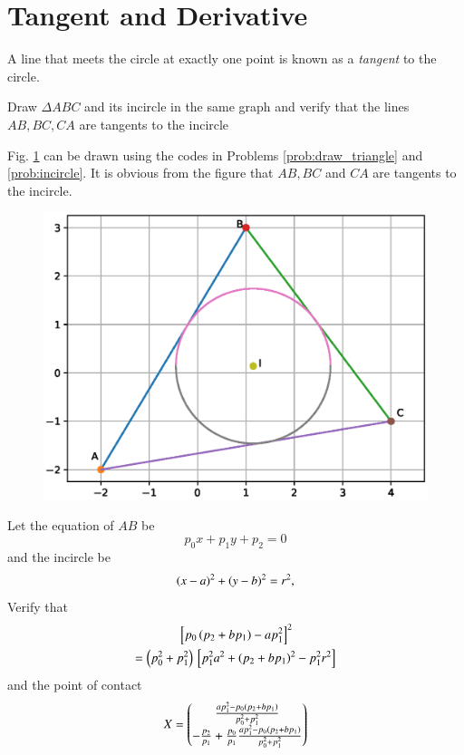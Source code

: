 \documentclass[journal,12pt,twocolumn]{IEEEtran}
\begin{document}
\section{Tangent and Derivative}
\begin{definition}
A line that meets the circle at exactly one point is known as a {\em tangent} to the circle.
\end{definition}
%
\begin{problem}
Draw $\Delta ABC$ and its incircle in the same graph and verify that the lines $AB, BC, CA$ are tangents to the incircle 
\end{problem}
\solution Fig. \ref{fig:tri_incircle} can be drawn using the codes in Problems \ref{prob:draw_triangle} and \ref{prob:incircle}.  It is obvious
from the figure that $AB,BC$ and $CA$ are tangents to the incircle.
%
\begin{figure}[!h]
\centering
\includegraphics[width=\columnwidth]{./figs/tri_incircle.eps}
\caption{}
\label{fig:tri_incircle}
\end{figure}
%
\begin{problem}
Let the equation of $AB$ be 
\begin{equation}
p_0x+p_1y+p_2 = 0
\end{equation}
%
and the incircle be
\begin{equation}
\left(x-a\right)^2 + \left(y-b\right)^2 = r^2,
\end{equation}
Verify that
\begin{multline}
{}\left[p_0\left(p_2+bp_1\right)-ap_1^2\right]^2 
\\
= \left(p_0^2+p_1^2\right){}\left[p_1^2a^2+\left(p_2+bp_1\right)^2-p_1^2r^2\right]
\end{multline}
and the point of contact 
\begin{equation}
X =
\begin{pmatrix}
\frac{ap_1^2-p_0\left(p_2+bp_1\right)}{p_0^2+p_1^2}
\\
-\frac{p_2}{p_1}+\frac{p_0}{p_1}\frac{ap_1^2-p_0\left(p_2+bp_1\right)}{p_0^2+p_1^2}
\end{pmatrix}
\end{equation} 
\end{problem}
\end{document}
